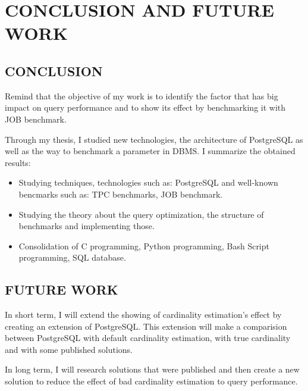 
\chapter{CONCLUSION AND FUTURE WORK}\label{chapter:future work}

\section{CONCLUSION}

Remind that the objective of my work is to identify the factor that has big impact on query performance and to show its effect by benchmarking it with JOB benchmark. 

Through my thesis, I studied new technologies, the architecture of PostgreSQL as well as the way to benchmark a parameter in DBMS. I summarize the obtained results:

\begin{itemize}
	\item Studying techniques, technologies such as: PostgreSQL and 			well-known bencmarks such as: TPC benchmarks, JOB benchmark.
	\item Studying the theory about the query optimization, the 				structure of benchmarks and implementing those.
	\item Consolidation of C programming, Python programming, Bash 				Script programming, SQL database.
\end{itemize} 

\section{FUTURE WORK}

In short term, I will extend the showing of cardinality estimation's effect by creating an extension of PostgreSQL. This extension will make a comparision between PostgreSQL with default cardinality estimation, with true cardinality and with some published solutions. 

In long term, I will research solutions that were published and then create a new solution to reduce the effect of bad cardinality estimation to query performance.



